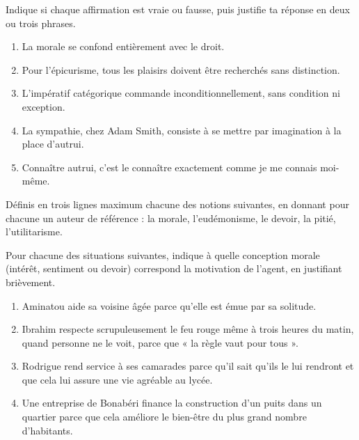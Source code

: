 \documentclass[11pt]{article}
\newcommand{\cle}[1]{{\popxbold\color{popdark}#1}}
\newcounter{popsec}
\newcounter{popsub}
\newcommand{\courssub}[1]{%
  \stepcounter{popsub}%
  \par\vspace{9pt}\noindent{\popxbold\fontsize{11.5}{13}\selectfont\color{popink}{\color{poporange}\thepopsec.\thepopsub}\hspace{6pt}#1}\par\nopagebreak\vspace{4pt}
}
\begin{document}
\begin{exercice}
Indique si chaque affirmation est vraie ou fausse, puis justifie ta réponse en deux ou trois phrases.
\begin{enumerate}
\item La morale se confond entièrement avec le droit.
\item Pour l'épicurisme, tous les plaisirs doivent être recherchés sans distinction.
\item L'impératif catégorique commande inconditionnellement, sans condition ni exception.
\item La sympathie, chez Adam Smith, consiste à se mettre par imagination à la place d'autrui.
\item Connaître autrui, c'est le connaître exactement comme je me connais moi-même.
\end{enumerate}
\end{exercice}

\begin{exercice}[Définitions]
Définis en trois lignes maximum chacune des notions suivantes, en donnant pour chacune un auteur de référence : la \cle{morale}, l'\cle{eudémonisme}, le \cle{devoir}, la \cle{pitié}, l'\cle{utilitarisme}.
\end{exercice}

\begin{exercice}
Pour chacune des situations suivantes, indique à quelle conception morale (intérêt, sentiment ou devoir) correspond la motivation de l'agent, en justifiant brièvement.
\begin{enumerate}
\item Aminatou aide sa voisine âgée parce qu'elle est émue par sa solitude.
\item Ibrahim respecte scrupuleusement le feu rouge même à trois heures du matin, quand personne ne le voit, parce que « la règle vaut pour tous ».
\item Rodrigue rend service à ses camarades parce qu'il sait qu'ils le lui rendront et que cela lui assure une vie agréable au lycée.
\item Une entreprise de Bonabéri finance la construction d'un puits dans un quartier parce que cela améliore le bien-être du plus grand nombre d'habitants.
\end{enumerate}
\end{exercice}

\courssub{Je m'entraîne}
\end{document}
